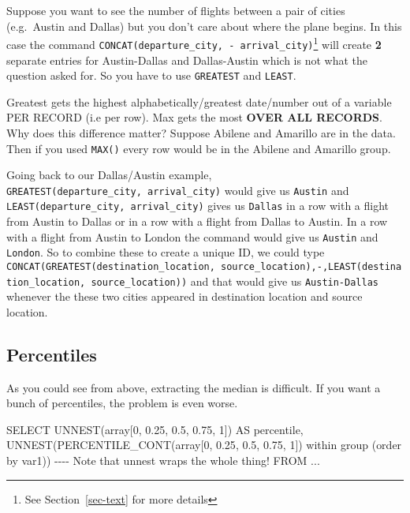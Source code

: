 \documentclass[
  letterpaper,
  DIV=11,
  numbers=noendperiod]{scrreprt}
\newenvironment{Shaded}{\begin{snugshade}}{\end{snugshade}}
\newcommand{\CommentTok}[1]{\textcolor[rgb]{0.37,0.37,0.37}{#1}}
\newcommand{\DataTypeTok}[1]{\textcolor[rgb]{0.68,0.00,0.00}{#1}}
\newcommand{\DecValTok}[1]{\textcolor[rgb]{0.68,0.00,0.00}{#1}}
\newcommand{\FloatTok}[1]{\textcolor[rgb]{0.68,0.00,0.00}{#1}}
\newcommand{\FunctionTok}[1]{\textcolor[rgb]{0.28,0.35,0.67}{#1}}
\newcommand{\KeywordTok}[1]{\textcolor[rgb]{0.00,0.23,0.31}{#1}}
\newcommand{\NormalTok}[1]{\textcolor[rgb]{0.00,0.23,0.31}{#1}}
\newcommand{\OperatorTok}[1]{\textcolor[rgb]{0.37,0.37,0.37}{#1}}
\begin{document}
Suppose you want to see the number of flights between a pair of cities
(e.g.~Austin and Dallas) but you don't care about where the plane
begins. In this case the command
\texttt{CONCAT(departure\_city,\ \textquotesingle{}-\textquotesingle{}\ arrival\_city)}\footnote{See
  Section~\ref{sec-text} for more details} will create \textbf{2}
separate entries for Austin-Dallas and Dallas-Austin which is not what
the question asked for. So you have to use \texttt{GREATEST} and
\texttt{LEAST}.

Greatest gets the highest alphabetically/greatest date/number out of a
variable PER RECORD (i.e per row). Max gets the most \textbf{OVER ALL
RECORDS}. Why does this difference matter? Suppose Abilene and Amarillo
are in the data. Then if you used \texttt{MAX()} every row would be in
the Abilene and Amarillo group.

Going back to our Dallas/Austin example,
\texttt{GREATEST(departure\_city,\ arrival\_city)} would give us
\texttt{Austin} and \texttt{LEAST(departure\_city,\ arrival\_city)}
gives us \texttt{Dallas} in a row with a flight from Austin to Dallas or
in a row with a flight from Dallas to Austin. In a row with a flight
from Austin to London the command would give us \texttt{Austin} and
\texttt{London}. So to combine these to create a unique ID, we could
type
\texttt{CONCAT(GREATEST(destination\_location,\ source\_location),\textquotesingle{}-\textquotesingle{},LEAST(destination\_location,\ source\_location))}
and that would give us \texttt{Austin-Dallas} whenever the these two
cities appeared in destination location and source location.

\hypertarget{percentiles}{%
\subsection{Percentiles}\label{percentiles}}

As you could see from above, extracting the median is difficult. If you
want a bunch of percentiles, the problem is even worse.

\begin{Shaded}
\begin{Highlighting}[]
\KeywordTok{SELECT} 
\NormalTok{UNNEST(}\DataTypeTok{array}\NormalTok{[}\DecValTok{0}\NormalTok{, }\FloatTok{0.25}\NormalTok{, }\FloatTok{0.5}\NormalTok{, }\FloatTok{0.75}\NormalTok{, }\DecValTok{1}\NormalTok{]) }\KeywordTok{AS}\NormalTok{ percentile, }
\NormalTok{UNNEST(}\FunctionTok{PERCENTILE\_CONT}\NormalTok{(}\DataTypeTok{array}\NormalTok{[}\DecValTok{0}\NormalTok{, }\FloatTok{0.25}\NormalTok{, }\FloatTok{0.5}\NormalTok{, }\FloatTok{0.75}\NormalTok{, }\DecValTok{1}\NormalTok{]) within }\KeywordTok{group}\NormalTok{ (}\KeywordTok{order} \KeywordTok{by}\NormalTok{ var1)) }\CommentTok{{-}{-}{-}{-} Note that unnest wraps the whole thing!  }
\KeywordTok{FROM} \OperatorTok{..}\NormalTok{.}
\end{Highlighting}
\end{Shaded}
\end{document}
